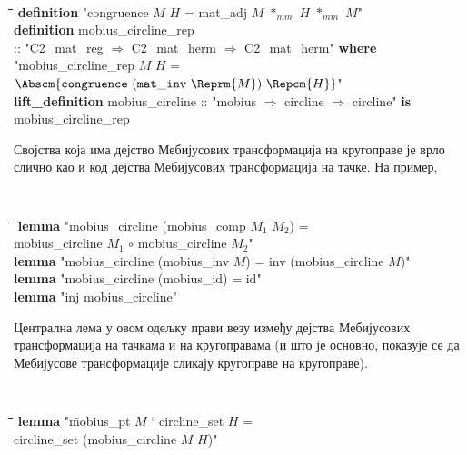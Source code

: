 {\tt
\begin{tabbing}
\hspace{5mm}\=\hspace{5mm}\=\hspace{5mm}\=\hspace{5mm}\=\hspace{5mm}\=\kill
{\bf definition} "congruence $M$ $H$ = mat\_adj $M$ $*_{mm}$ $H$ $*_{mm}$ $M$"\\
{\bf definition} mobius\_circline\_rep \\
\>:: "C2\_mat\_reg $\Rightarrow$ C2\_mat\_herm $\Rightarrow$ C2\_mat\_herm" {\bf where}\\
\>"mobius\_circline\_rep $M$ $H$ = $\Abscm{\mathtt{congruence}\ (\mathtt{mat\_inv}\ \Reprm{M})\ \Repcm{H}}$"\\
{\bf lift\_definition} mobius\_circline :: "mobius $\Rightarrow$ circline $\Rightarrow$ circline" {\bf is} \\
\>mobius\_circline\_rep
\end{tabbing}
}

\noindent Својства која има дејство Мебијусових трансформација на кругоправе је врло слично као и код дејства Мебијусових трансформација на тачке. На пример, 

{\tt
\begin{tabbing}
\hspace{5mm}\=\hspace{5mm}\=\hspace{5mm}\=\hspace{5mm}\=\hspace{5mm}\=\kill
{\bf lemma} "\=mobius\_circline (mobius\_comp $M_1$ $M_2$) = \\
\>mobius\_circline $M_1$ $\circ$ mobius\_circline $M_2$"\\
{\bf lemma} "mobius\_circline (mobius\_inv $M$) = inv (mobius\_circline $M$)"\\
{\bf lemma} "mobius\_circline (mobius\_id) = id"\\
{\bf lemma} "inj mobius\_circline"
\end{tabbing}
}

Централна лема у овом одељку прави везу између дејства Мебијусових
трансформација на тачкама и на кругоправама (и што је основно,
показује се да Мебијусове трансформације сликају кругоправе на
кругоправе).

{\tt
\begin{tabbing}
\hspace{5mm}\=\hspace{5mm}\=\hspace{5mm}\=\hspace{5mm}\=\hspace{5mm}\=\kill
{\bf lemma} "\=mobius\_pt $M$ ` circline\_set $H$ = \\
\>circline\_set (mobius\_circline $M$ $H$)"
\end{tabbing}
}

